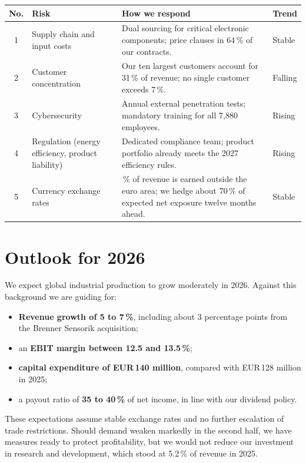 \documentclass[10.5pt,a4paper]{article}
\newcommand{\eur}{EUR\,}
\begin{document}
\sffamily\small
\begin{tabularx}{\linewidth}{@{}c >{\raggedright\arraybackslash}p{3.2cm} >{\raggedright\arraybackslash}X >{\raggedright\arraybackslash}p{1.6cm}@{}}
  \toprule
  \textbf{No.} & \textbf{Risk} & \textbf{How we respond} & \textbf{Trend} \\
  \midrule
  1 & Supply chain and input costs & Dual sourcing for critical electronic components; price clauses in 64\,\% of our contracts. & Stable \\
  2 & Customer concentration & Our ten largest customers account for 31\,\% of revenue; no single customer exceeds 7\,\%. & Falling \\
  3 & Cybersecurity & Annual external penetration tests; mandatory training for all 7,880 employees. & Rising \\
  4 & Regulation (energy efficiency, product liability) & Dedicated compliance team; product portfolio already meets the 2027 efficiency rules. & Rising \\
  5 & Currency exchange rates & 38\,\% of revenue is earned outside the euro area; we hedge about 70\,\% of expected net exposure twelve months ahead. & Stable \\
  \bottomrule
\end{tabularx}
\rmfamily\normalsize

\section{Outlook for 2026}
We expect global industrial production to grow moderately in 2026. Against this background we are guiding for:
\begin{itemize}[leftmargin=1.4em, itemsep=0.1em]
  \item \textbf{Revenue growth of 5 to 7\,\%}, including about 3 percentage points from the Brenner Sensorik acquisition;
  \item an \textbf{EBIT margin between 12.5 and 13.5\,\%};
  \item \textbf{capital expenditure of \eur 140 million}, compared with \eur 128 million in 2025;
  \item a payout ratio of \textbf{35 to 40\,\%} of net income, in line with our dividend policy.
\end{itemize}
These expectations assume stable exchange rates and no further escalation of trade restrictions. Should demand
weaken markedly in the second half, we have measures ready to protect profitability, but we would not
reduce our investment in research and development, which stood at 5.2\,\% of revenue in 2025.
\end{document}
